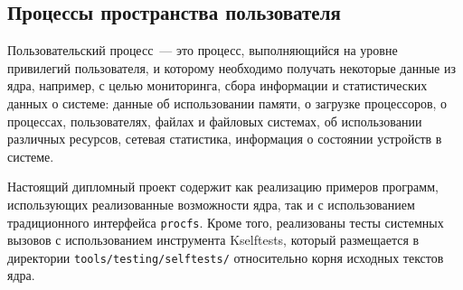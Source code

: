 \subsection{Процессы пространства пользователя}
\label{sub:sys:sys_pidfdinfo}

Пользовательский процесс~--- это процесс, выполняющийся на уровне
привилегий пользователя, и которому необходимо получать некоторые данные из
ядра, например, с целью мониторинга, сбора информации и статистических данных о
системе: данные об использовании памяти, о загрузке процессоров, о процессах,
пользователях, файлах и файловых системах, об использовании различных ресурсов,
сетевая статистика, информация о состоянии устройств в системе.

Настоящий дипломный проект содержит как реализацию примеров программ,
использующих реализованные возможности ядра, так и с использованием
традиционного интерфейса \texttt{procfs}. Кроме того, реализованы тесты
системных вызовов с использованием инструмента Kselftests, который размещается в
директории \texttt{tools/testing/selftests/} относительно корня исходных текстов
ядра.
